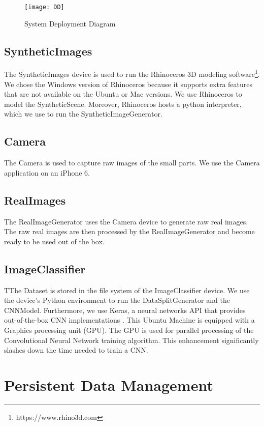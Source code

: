 \begin{figure}[h]
\centering
  \texttt{[image: DD]}
\caption{System Deployment Diagram}
\label{fig:DD}
\end{figure}

\subsection{SyntheticImages}
The SyntheticImages device is used to run the Rhinoceros 3D modeling software\footnote{https://www.rhino3d.com}. We chose the Windows version of Rhinoceros because it supports extra features that are not available on the Ubuntu or Mac versions. We use Rhinoceros to model the SyntheticScene. Moreover, Rhinoceros hosts a python interpreter, which we use to run the SyntheticImageGenerator.

\subsection{Camera}
The Camera is used to capture raw images of the small parts. We use the Camera application on an iPhone 6.

\subsection{RealImages}
The RealImageGenerator uses the Camera device to generate raw real images. The raw real images are then processed by the RealImageGenerator and become ready to be used out of the box.

\subsection{ImageClassifier}
TThe Dataset is stored in the file system of the ImageClassifier device. We use the device's Python environment to run the DataSplitGenerator and the CNNModel. Furthermore, we use Keras, a neural networks API that provides out-of-the-box CNN implementations \cite{chollet2015keras}. This Ubuntu Machine is equipped with a Graphics processing unit (GPU). The GPU is used for parallel processing of the Convolutional Neural Network training algorithm. This enhancement significantly slashes down the time needed to train a CNN.

\section{Persistent Data Management}

